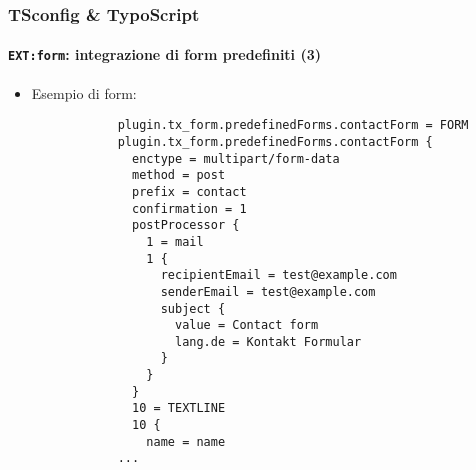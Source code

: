 \begin{frame}[fragile]
	\frametitle{TSconfig \& TypoScript}
	\framesubtitle{\texttt{EXT:form}: integrazione di form predefiniti (3)}

	\lstset{basicstyle=\tiny\ttfamily}

	\begin{itemize}

		\item Esempio di form:

		\begin{lstlisting}
			plugin.tx_form.predefinedForms.contactForm = FORM
			plugin.tx_form.predefinedForms.contactForm {
			  enctype = multipart/form-data
			  method = post
			  prefix = contact
			  confirmation = 1
			  postProcessor {
			    1 = mail
			    1 {
			      recipientEmail = test@example.com
			      senderEmail = test@example.com
			      subject {
			        value = Contact form
			        lang.de = Kontakt Formular
			      }
			    }
			  }
			  10 = TEXTLINE
			  10 {
			    name = name
			...
		\end{lstlisting}

	\end{itemize}

\end{frame}

